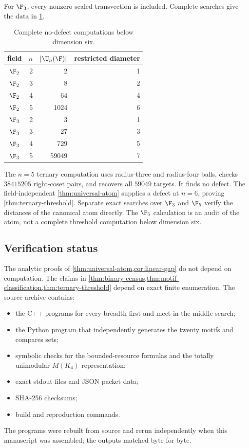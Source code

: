 For $\F_3$, every nonzero scaled transvection is included.  Complete searches give the data in \cref{tab:small-fields}.

\begin{table}[t]
\centering
\caption{Complete no-defect computations below dimension six.}
\label{tab:small-fields}
\begin{tabular}{@{}crrr@{}}
\toprule
field & $n$ & $|\U_n(\F)|$ & restricted diameter\\
\midrule
$\F_2$&2&2&1\\
$\F_2$&3&8&2\\
$\F_2$&4&64&4\\
$\F_2$&5&1024&6\\
\addlinespace
$\F_3$&2&3&1\\
$\F_3$&3&27&3\\
$\F_3$&4&729&5\\
$\F_3$&5&59049&7\\
\bottomrule
\end{tabular}
\end{table}

The $n=5$ ternary computation uses radius-three and radius-four balls, checks $38415205$ right-coset pairs, and recovers all $59049$ targets.  It finds no defect.  The field-independent \cref{thm:universal-atom} supplies a defect at $n=6$, proving \cref{thm:ternary-threshold}.  Separate exact searches over $\F_3$ and $\F_5$ verify the distances of the canonical atom directly.  The $\F_5$ calculation is an audit of the atom, not a complete threshold computation below dimension six.

\subsection{Verification status}

The analytic proofs of \cref{thm:universal-atom,cor:linear-gap} do not depend on computation.  The claims in \cref{thm:binary-census,thm:motif-classification,thm:ternary-threshold} depend on exact finite enumeration.  The source archive contains:
\begin{itemize}
\item the C++ programs for every breadth-first and meet-in-the-middle search;
\item the Python program that independently generates the twenty motifs and compares sets;
\item symbolic checks for the bounded-resource formulas and the totally unimodular $M(K_4)$ representation;
\item exact stdout files and JSON packet data;
\item SHA-256 checksums;
\item build and reproduction commands.
\end{itemize}
The programs were rebuilt from source and rerun independently when this manuscript was assembled; the outputs matched byte for byte.


